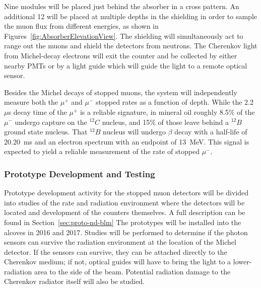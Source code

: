Nine modules will be placed just behind the absorber in a cross pattern.  An additional 12 will be 
placed at multiple depths in the shielding in order to sample the muon flux
from different energies, as shown in Figures~\ref{fig:AbsorberElevationView}. 
The shielding will simultaneously act to range out the muons and shield the detectors from 
neutrons. The Cherenkov light from Michel-decay electrons will exit the 
counter and be collected by either nearby PMTs or by a light guide which will
guide the light to a remote optical sensor.  


Besides the Michel decays of stopped muons, the system will
independently measure both the $\mu ^{+}$ and $\mu ^{-}$ stopped
rates as a function of depth. 
While the 2.2~$\mu $s decay time of the $\mu^+$ is a reliable
signature, in mineral oil roughly 8.5\% of the $\mu^{-}$ undergo capture
on the $^{12}C$ nucleus, and 15\% of those leave behind a $^{12}B$
ground state nucleus. That $^{12}B$ nucleus will undergo $\beta$ decay
with a half-life of 20.20~ms and an electron spectrum with an endpoint
of 13~MeV. This signal is expected to yield a reliable measurement of the rate of stopped
$\mu^{-}$.

\subsubsection{Prototype Development and Testing}

Prototype development activity for the stopped muon detectors will
be divided into studies of the rate and radiation environment where
the detectors will be located and development of the counters
themselves. A full description can be found in Section~\ref{sec:proto-nd-blm}
The prototypes will be installed into the alcoves in 2016 and 2017.
Studies will be performed to determine if the photon sensors
can survive the radiation environment at the location of the Michel
detector. If the sensors can survive, they can be attached directly to
the Cherenkov medium; if not, optical guides will have to bring the
light to a lower-radiation area to the side of the beam. Potential
radiation damage to the Cherenkov radiator itself will also be
studied.



